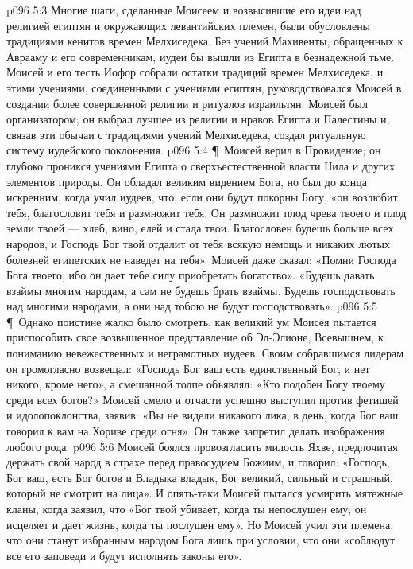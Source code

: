 \vs p096 5:3 Многие шаги, сделанные Моисеем и возвысившие его идеи над религией египтян и окружающих левантийских племен, были обусловлены традициями кенитов времен Мелхиседека. Без учений Махивенты, обращенных к Аврааму и его современникам, иудеи бы вышли из Египта в безнадежной тьме. Моисей и его тесть Иофор собрали остатки традиций времен Мелхиседека, и этими учениями, соединенными с учениями египтян, руководствовался Моисей в создании более совершенной религии и ритуалов израильтян. Моисей был организатором; он выбрал лучшее из религии и нравов Египта и Палестины и, связав эти обычаи с традициями учений Мелхиседека, создал ритуальную систему иудейского поклонения.
\vs p096 5:4 \P\ Моисей верил в Провидение; он глубоко проникся учениями Египта о сверхъестественной власти Нила и других элементов природы. Он обладал великим видением Бога, но был до конца искренним, когда учил иудеев, что, если они будут покорны Богу, «он возлюбит тебя, благословит тебя и размножит тебя. Он размножит плод чрева твоего и плод земли твоей --- хлеб, вино, елей и стада твои. Благословен будешь больше всех народов, и Господь Бог твой отдалит от тебя всякую немощь и никаких лютых болезней египетских не наведет на тебя». Моисей даже сказал: «Помни Господа Бога твоего, ибо он дает тебе силу приобретать богатство». «Будешь давать взаймы многим народам, а сам не будешь брать взаймы. Будешь господствовать над многими народами, а они над тобою не будут господствовать».
\vs p096 5:5 \P\ Однако поистине жалко было смотреть, как великий ум Моисея пытается приспособить свое возвышенное представление об Эл\hyp{}Элионе, Всевышнем, к пониманию невежественных и неграмотных иудеев. Своим собравшимся лидерам он громогласно возвещал: «Господь Бог ваш есть единственный Бог, и нет никого, кроме него», а смешанной толпе объявлял: «Кто подобен Богу твоему среди всех богов?» Моисей смело и отчасти успешно выступил против фетишей и идолопоклонства, заявив: «Вы не видели никакого лика, в день, когда Бог ваш говорил к вам на Хориве среди огня». Он также запретил делать изображения любого рода.
\vs p096 5:6 Моисей боялся провозгласить милость Яхве, предпочитая держать свой народ в страхе перед правосудием Божиим, и говорил: «Господь, Бог ваш, есть Бог богов и Владыка владык, Бог великий, сильный и страшный, который не смотрит на лица». И опять\hyp{}таки Моисей пытался усмирить мятежные кланы, когда заявил, что «Бог твой убивает, когда ты непослушен ему; он исцеляет и дает жизнь, когда ты послушен ему». Но Моисей учил эти племена, что они станут избранным народом Бога лишь при условии, что они «соблюдут все его заповеди и будут исполнять законы его».
